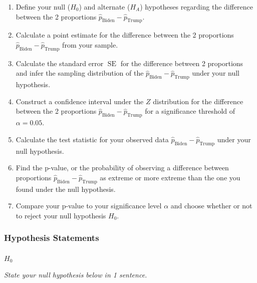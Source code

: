 \documentclass[
  letterpaper,
  DIV=11,
  numbers=noendperiod]{scrartcl}
\makeatletter
\let\oldparagraph\paragraph
\renewcommand{\paragraph}{
    \@ifstar
      \xxxParagraphStar
      \xxxParagraphNoStar
  }
\newcommand{\xxxParagraphStar}[1]{\oldparagraph*{#1}\mbox{}}
\newcommand{\xxxParagraphNoStar}[1]{\oldparagraph{#1}\mbox{}}
\makeatother
\begin{document}
\begin{enumerate}
\def\labelenumi{\arabic{enumi}.}
\item
  Define your null (\(H_0\)) and alternate (\(H_A\)) hypotheses
  regarding the difference between the 2 proportions
  \(\hat{p}_{\text{Biden}}-\hat{p}_{\text{Trump}}\).
\item
  Calculate a point estimate for the difference between the 2
  proportions \(\hat{p}_{\text{Biden}}-\hat{p}_{\text{Trump}}\) from
  your sample.
\item
  Calculate the standard error \(\operatorname{SE}\) for the difference
  between 2 proportions and infer the sampling distribution of the
  \(\hat{p}_{\text{Biden}}-\hat{p}_{\text{Trump}}\) under your null
  hypothesis.
\item
  Construct a confidence interval under the \(Z\) distribution for the
  difference between the 2 proportions
  \(\hat{p}_{\text{Biden}}-\hat{p}_{\text{Trump}}\) for a significance
  threshold of \(\alpha=0.05\).
\item
  Calculate the test statistic for your observed data
  \(\hat{p}_{\text{Biden}}-\hat{p}_{\text{Trump}}\) under your null
  hypothesis.
\item
  Find the p-value, or the probability of observing a difference between
  proportions \(\hat{p}_{\text{Biden}}-\hat{p}_{\text{Trump}}\) as
  extreme or more extreme than the one you found under the null
  hypothesis.
\item
  Compare your p-value to your significance level \(\alpha\) and choose
  whether or not to reject your null hypothesis \(H_0\).
\end{enumerate}

\subsubsection{Hypothesis Statements}\label{hypothesis-statements}

\paragraph{\texorpdfstring{\(H_0\)}{H\_0}}\label{h_0}

\emph{State your null hypothesis below in 1 sentence.}
\end{document}
